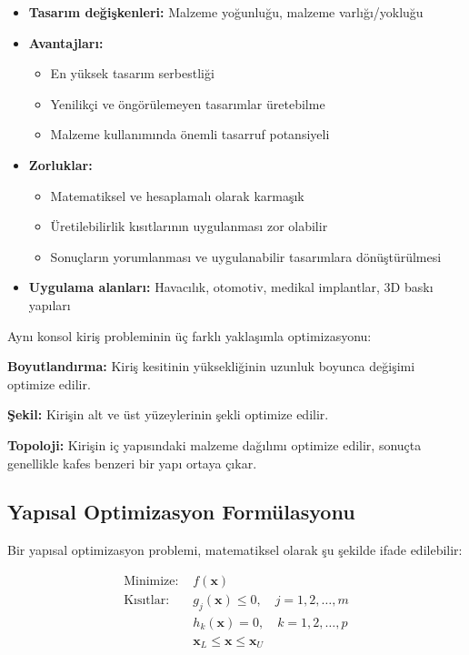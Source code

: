 \begin{itemize}
    \item \textbf{Tasarım değişkenleri:} Malzeme yoğunluğu, malzeme varlığı/yokluğu
    \item \textbf{Avantajları:} 
    \begin{itemize}
        \item En yüksek tasarım serbestliği
        \item Yenilikçi ve öngörülemeyen tasarımlar üretebilme
        \item Malzeme kullanımında önemli tasarruf potansiyeli
    \end{itemize}
    \item \textbf{Zorluklar:} 
    \begin{itemize}
        \item Matematiksel ve hesaplamalı olarak karmaşık
        \item Üretilebilirlik kısıtlarının uygulanması zor olabilir
        \item Sonuçların yorumlanması ve uygulanabilir tasarımlara dönüştürülmesi
    \end{itemize}
    \item \textbf{Uygulama alanları:} Havacılık, otomotiv, medikal implantlar, 3D baskı yapıları
\end{itemize}


\begin{tcolorbox}[title=Örnek: Konsol Kiriş Optimizasyonu]
Aynı konsol kiriş probleminin üç farklı yaklaşımla optimizasyonu:

\textbf{Boyutlandırma:} Kiriş kesitinin yüksekliğinin uzunluk boyunca değişimi optimize edilir.

\textbf{Şekil:} Kirişin alt ve üst yüzeylerinin şekli optimize edilir.

\textbf{Topoloji:} Kirişin iç yapısındaki malzeme dağılımı optimize edilir, sonuçta genellikle kafes benzeri bir yapı ortaya çıkar.
\end{tcolorbox}

\subsection{Yapısal Optimizasyon Formülasyonu}

Bir yapısal optimizasyon problemi, matematiksel olarak şu şekilde ifade edilebilir:

\begin{align}
\text{Minimize: } & f(\mathbf{x}) \\
\text{Kısıtlar: } & g_j(\mathbf{x}) \leq 0, \quad j = 1, 2, \ldots, m \\
& h_k(\mathbf{x}) = 0, \quad k = 1, 2, \ldots, p \\
& \mathbf{x}_L \leq \mathbf{x} \leq \mathbf{x}_U
\end{align}

